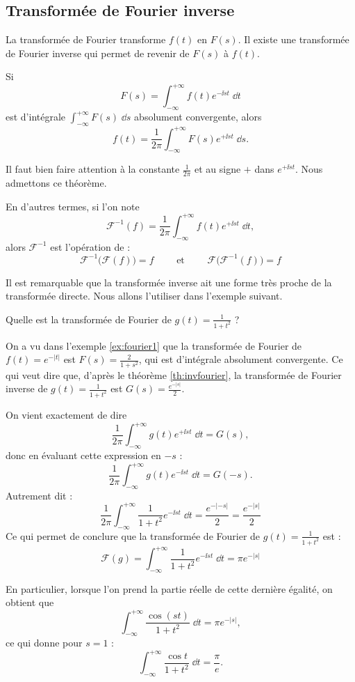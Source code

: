 \documentclass[class=report,crop=false]{standalone}
\begin{document}
\subsection{Transformée de Fourier inverse}

La transformée de Fourier transforme $f(t)$ en $F(s)$.
Il existe une transformée de Fourier inverse qui permet de revenir de
$F(s)$ à $f(t)$.
\begin{theoreme}
\label{th:invfourier}
Si $$F(s) = \int_{-\infty}^{+\infty} f(t) e^{-\ii st}\;\dd t$$ 
est d'intégrale $\int_{-\infty}^{+\infty} F(s)\;\dd s$ absolument convergente,
alors 
$$f(t) = \frac{1}{2\pi} \int_{-\infty}^{+\infty} F(s) e^{+\ii st}\;\dd s.$$
\end{theoreme}

Il faut bien faire attention à la constante $\frac{1}{2\pi}$ et au signe $+$
dans $e^{+\ii st}$. Nous admettons ce théorème.

En d'autres termes, si l'on note 
$$\mathcal{F}^{-1}(f) = \frac{1}{2\pi} \int_{-\infty}^{+\infty} f(t) e^{+\ii st}\;\dd t,$$
alors $\mathcal{F}^{-1}$ est l'opération de  :
$$\mathcal{F}^{-1} \big( \mathcal{F}(f) \big) = f \qquad \text{ et } \qquad
\mathcal{F} \big( \mathcal{F}^{-1}(f) \big) = f$$

Il est remarquable que la transformée inverse ait 
une forme très proche de la transformée directe.
Nous allons l'utiliser dans l'exemple suivant.
\begin{exemple}
Quelle est la transformée de Fourier de $g(t) = \frac{1}{1+t^2}$ ?  

On a vu dans l'exemple \ref{ex:fourier1} que la transformée de Fourier de 
$f(t) = e^{-|t|}$ est $F(s) = \frac{2}{1+s^2}$, qui est d'intégrale absolument convergente.
Ce qui veut dire que, d'après le théorème \ref{th:invfourier}, la transformée de Fourier inverse de 
$g(t) = \frac{1}{1+t^2}$ est $G(s) = \frac{e^{-|s|}}{2}$.


On vient exactement de dire 
$$\frac{1}{2\pi} \int_{-\infty}^{+\infty} g(t) e^{+\ii st}\;\dd t
=G(s),$$
donc en évaluant cette expression en $-s$ :
$$\frac{1}{2\pi} \int_{-\infty}^{+\infty} g(t) e^{-\ii st}\;\dd t
=G(-s).$$
Autrement dit :
$$\frac{1}{2\pi} \int_{-\infty}^{+\infty} \frac{1}{1+t^2} e^{-\ii st}\;\dd t
= \frac{e^{-|-s|}}{2}= \frac{e^{-|s|}}{2}$$
Ce qui permet de conclure que la transformée de Fourier de $g(t)=\frac{1}{1+t^2}$ est :
$$\mathcal{F}(g) = \int_{-\infty}^{+\infty} \frac{1}{1+t^2} e^{-\ii st}\;\dd t=\pi e^{-|s|}$$

\medskip

En particulier, lorsque l'on prend la partie réelle de cette dernière égalité, on obtient
que 
$$ \int_{-\infty}^{+\infty} \frac{\cos (st)}{1+t^2} \;\dd t= \pi e^{-|s|},$$
ce qui donne pour $s=1$ :
$$ \int_{-\infty}^{+\infty} \frac{\cos t}{1+t^2} \;\dd t= \frac{\pi}{e}.$$
\end{exemple}
\end{document}
